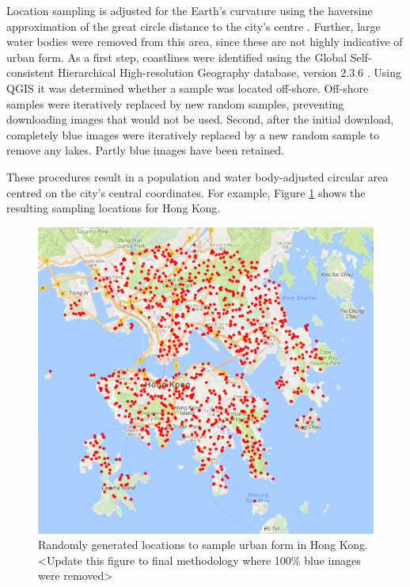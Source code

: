 \documentclass[final,3p,times,authoryear]{elsarticle}
\begin{document}
Location sampling is adjusted for the Earth’s curvature using the haversine approximation of the great circle distance to the city’s centre \citep{Sinnott1984}. Further, large water bodies were removed from this area, since these are not highly indicative of urban form. As a first step, coastlines were identified using the Global Self-consistent Hierarchical High-resolution Geography database, version 2.3.6 \citep{Wessel1996}. Using QGIS \citep{QGIS2009} it was determined whether a sample was located off-shore. Off-shore samples were iteratively replaced by new random samples, preventing downloading images that would not be used. Second, after the initial download, completely blue images were iteratively replaced by a new random sample to remove any lakes. Partly blue images have been retained.

These procedures result in a population and water body-adjusted circular area centred on the city’s central coordinates. For example, Figure \ref{fig:hongkong}  shows the resulting sampling locations for Hong Kong.



\begin{figure}[!htbp] \label{fig:hongkong}  
    \centering    
\includegraphics[scale=1]{Images/HongKong.png} 
\caption{Randomly generated locations to sample urban form in Hong Kong. <Update this figure to final methodology where 100\% blue images were removed>} 
\end{figure}
\end{document}
